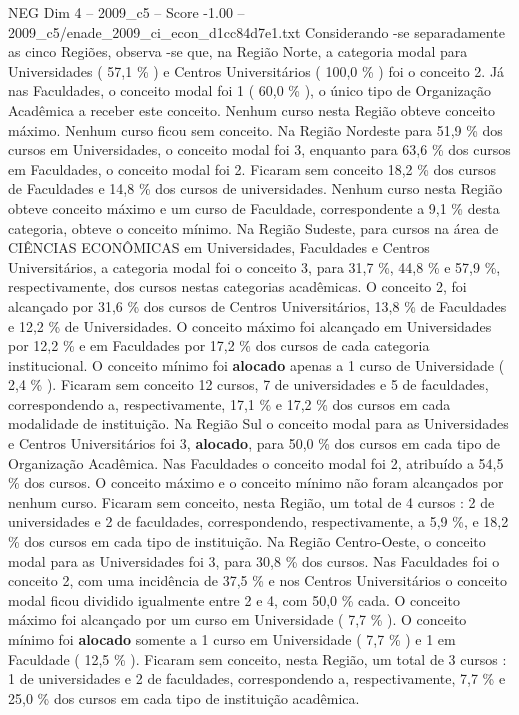 \begin{textsample}{NEG Dim 4 – 2009\_c5 – Score -1.00 – 2009\_c5/enade\_2009\_ci\_econ\_d1cc84d7e1.txt}
Considerando -se separadamente as cinco Regiões, observa -se que, na Região Norte, a categoria modal para Universidades ( 57,1 \% ) e Centros Universitários ( 100,0 \% ) foi o conceito 2.
Já nas Faculdades, o conceito modal foi 1 ( 60,0 \% ), o único tipo de Organização Acadêmica a receber este conceito.
Nenhum curso nesta Região obteve conceito máximo.
Nenhum curso ficou sem conceito.
Na Região Nordeste para 51,9 \% dos cursos em Universidades, o conceito modal foi 3, enquanto para 63,6 \% dos cursos em Faculdades, o conceito modal foi 2.
Ficaram sem conceito 18,2 \% dos cursos de Faculdades e 14,8 \% dos cursos de universidades.
Nenhum curso nesta Região obteve conceito máximo e um curso de Faculdade, correspondente a 9,1 \% desta categoria, obteve o conceito mínimo.
Na Região Sudeste, para cursos na área de CIÊNCIAS ECONÔMICAS em Universidades, Faculdades e Centros Universitários, a categoria modal foi o conceito 3, para 31,7 \%, 44,8 \% e 57,9 \%, respectivamente, dos cursos nestas categorias acadêmicas.
O conceito 2, foi alcançado por 31,6 \% dos cursos de Centros Universitários, 13,8 \% de Faculdades e 12,2 \% de Universidades.
O conceito máximo foi alcançado em Universidades por 12,2 \% e em Faculdades por 17,2 \% dos cursos de cada categoria institucional.
O conceito mínimo foi \textbf{alocado} apenas a 1 curso de Universidade ( 2,4 \% ).
Ficaram sem conceito 12 cursos, 7 de universidades e 5 de faculdades, correspondendo a, respectivamente, 17,1 \% e 17,2 \% dos cursos em cada modalidade de instituição.
Na Região Sul o conceito modal para as Universidades e Centros Universitários foi 3, \textbf{alocado}, para 50,0 \% dos cursos em cada tipo de Organização Acadêmica.
Nas Faculdades o conceito modal foi 2, atribuído a 54,5 \% dos cursos.
O conceito máximo e o conceito mínimo não foram alcançados por nenhum curso.
Ficaram sem conceito, nesta Região, um total de 4 cursos : 2 de universidades e 2 de faculdades, correspondendo, respectivamente, a 5,9 \%, e 18,2 \% dos cursos em cada tipo de instituição.
Na Região Centro-Oeste, o conceito modal para as Universidades foi 3, para 30,8 \% dos cursos.
Nas Faculdades foi o conceito 2, com uma incidência de 37,5 \% e nos Centros Universitários o conceito modal ficou dividido igualmente entre 2 e 4, com 50,0 \% cada.
O conceito máximo foi alcançado por um curso em Universidade ( 7,7 \% ).
O conceito mínimo foi \textbf{alocado} somente a 1 curso em Universidade ( 7,7 \% ) e 1 em Faculdade ( 12,5 \% ).
Ficaram sem conceito, nesta Região, um total de 3 cursos : 1 de universidades e 2 de faculdades, correspondendo a, respectivamente, 7,7 \% e 25,0 \% dos cursos em cada tipo de instituição acadêmica.

\end{textsample}
